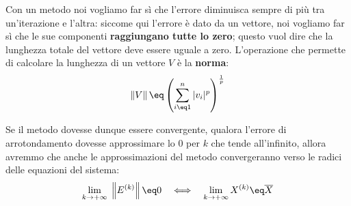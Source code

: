 Con un metodo noi vogliamo far sì che l'errore diminuisca sempre di più tra un'iterazione e l'altra: siccome qui l'errore è dato da un vettore, noi vogliamo far sì che le sue componenti \textbf{raggiungano tutte lo zero}; questo vuol dire che la lunghezza totale del vettore deve essere uguale a zero. L'operazione che permette di calcolare la lunghezza di un vettore $V$ è la \textbf{norma}:
\[ \left\| V \right\| \eq \left( \sum_{i \eq 1}^n |v_i|^p \right)^{\frac{1}{p}} \]

Se il metodo dovesse dunque essere convergente, qualora l'errore di arrotondamento dovesse approssimare lo 0 per $k$ che tende all'infinito, allora avremmo che anche le approssimazioni del metodo convergeranno verso le radici delle equazioni del sistema:
\[ \lim_{k \to +\infty} \; \left\| E^{(k)} \right\| \eq 0 \quad \Longleftrightarrow \quad \lim_{k \to +\infty} X^{(k)} \eq \overline{X} \]